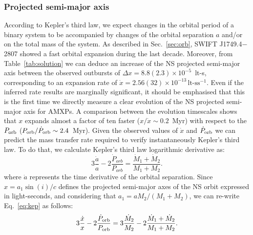 \documentclass[fleqn,usenatbib]{mnras}
\newcommand{\swiftj}{SWIFT J1749.4$-$2807}
\begin{document}
\subsubsection{Projected semi-major axis}
According to Kepler's third law, we expect changes in the orbital period of a binary system to be accompanied by changes of the orbital separation $a$ and/or on the total mass of the system. As described in Sec.~\ref{sec:orb}, \swiftj{} showed a fast orbital expansion during the last decade. Moreover, from Table~\ref{tab:solution} we can deduce an increase of the NS projected semi-major axis between the observed outbursts of $\Delta x=8.8(2.3)\times 10^{-5}$~lt-s, corresponding to an expansion rate of $\dot{x}=2.56(32)\times 10^{-13}\,\text{lt-s}\text{s}^{-1}$. Even if the inferred rate results are marginally significant, it should be emphasised that this is the first time we directly measure a clear evolution of the NS projected semi-major axis for AMXPs. A comparison between the evolution timescales shows that $x$ expands almost a factor of ten faster ($x/\dot{x}\sim 0.2$~Myr) with respect to the $P_{\rm orb}$ ($P_{\rm orb}/\dot{P}_{\rm orb}\sim 2.4$~Myr). 
Given the observed values of $\dot{x}$ and $\dot{P}_{\rm orb}$ we can predict the mass transfer rate required to verify instantaneously Kepler's third law. To do that, we calculate Kepler's third law logarithmic derivative as:
\begin{equation}
\label{eq:kep}
3\frac{\dot{a}}{a}-2\frac{\dot{P}_{orb}}{P_{orb}}=\frac{\dot{M}_1+\dot{M}_2}{M_1+M_2}.
\end{equation}  
where $\dot{a}$ represents the time derivative of the orbital separation. Since $x=a_1 \sin(i)/c$ defines the projected semi-major axes of the NS orbit expressed in light-seconds, and considering that $a_1=aM_2/(M_1+M_2)$, we can re-write Eq.~\ref{eq:kep} as follows:
\begin{equation}
\label{eq:kep2}
3\frac{\dot{x}}{x}-2\frac{\dot{P}_{\rm orb}}{P_{\rm orb}}=3\frac{\dot{M}_2}{M_2}-2\frac{\dot{M}_1+\dot{M}_2}{M_1+M_2}.
\end{equation}
\end{document}
